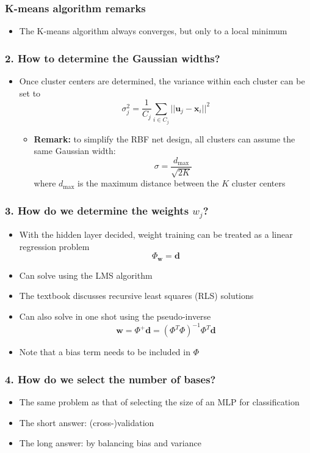 \documentclass[12pt,notes,mathserif]{beamer}
\begin{document}
\begin{frame}[c]
	\frametitle{K-means algorithm remarks}
	\begin{itemize}
		\item The K-means algorithm always converges, but only to a local minimum
	\end{itemize}
\end{frame}


\begin{frame}[c]
	\frametitle{2. How to determine the Gaussian widths?}
	\begin{itemize}
		\item Once cluster centers are determined, the variance within each cluster can be set to
		      \[
			      \sigma_j^2=\frac{1}{C_j}\sum_{i\in C_j}||\mathbf{u}_j-\mathbf{x}_i||^2
		      \]
		      \begin{itemize}
			      \item {\bf Remark:} to simplify the RBF net design, all clusters can assume the same Gaussian width:
			            \[
				            \sigma=\frac{d_{\max}}{\sqrt{2K}}
			            \]
			            where $d_{\max}$ is the maximum distance between the $K$ cluster centers
		      \end{itemize}
	\end{itemize}
\end{frame}

\begin{frame}[c]
	\frametitle{3. How do we determine the weights $w_j$?}
	\begin{itemize}
		\item With the hidden layer decided, weight training can be treated as a linear regression problem
		      \[
			      \Phi_\mathbf{w}=\mathbf{d}
		      \]
		\item Can solve using the LMS algorithm
		\item The textbook discusses recursive least squares (RLS) solutions
		\item Can also solve in one shot using the pseudo-inverse
		      \[
			      \mathbf{w}=\Phi^+\mathbf{d}=(\Phi^T\Phi)^{-1}\Phi^T\mathbf{d}
		      \]
		\item Note that a bias term needs to be included in ${\Phi}$
	\end{itemize}
\end{frame}



\begin{frame}[c]
	\frametitle{4. How do we select the number of bases?}
	\begin{itemize}
		\item The same problem as that of selecting the size of an MLP for classification
		\item The short answer: (cross-)validation
		\item The long answer: by balancing bias and variance
	\end{itemize}
\end{frame}
\end{document}
